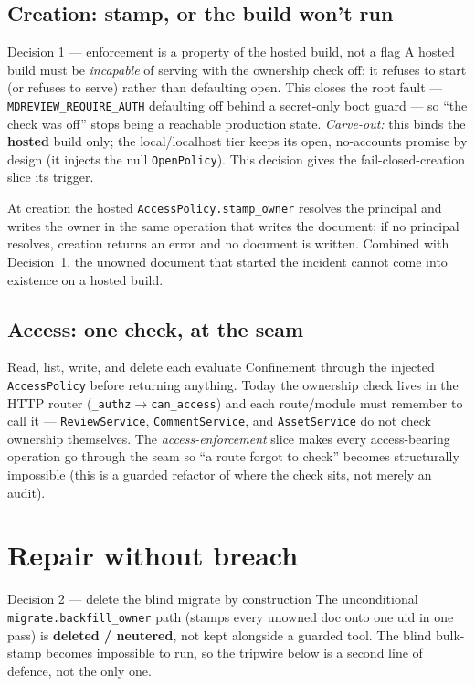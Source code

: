 \documentclass[11pt]{article}
\begin{document}
\subsection{Creation: stamp, or the build won't run}
\begin{decision}{Decision 1 --- enforcement is a property of the hosted build, not a flag}
A hosted build must be \emph{incapable} of serving with the ownership check off: it refuses to
start (or refuses to serve) rather than defaulting open. This closes the root fault ---
\texttt{MDREVIEW\_REQUIRE\_AUTH} defaulting off behind a secret-only boot guard --- so ``the
check was off'' stops being a reachable production state. \emph{Carve-out:} this binds the
\textbf{hosted} build only; the local/localhost tier keeps its open, no-accounts promise by
design (it injects the null \texttt{OpenPolicy}). This decision gives the fail-closed-creation
slice its trigger.
\end{decision}

At creation the hosted \texttt{AccessPolicy.stamp\_owner} resolves the principal and writes the
owner in the same operation that writes the document; if no principal resolves, creation returns
an error and no document is written. Combined with Decision~1, the unowned document that started
the incident cannot come into existence on a hosted build.

\subsection{Access: one check, at the seam}
Read, list, write, and delete each evaluate Confinement through the injected \texttt{AccessPolicy}
before returning anything. Today the ownership check lives in the HTTP router
(\texttt{\_authz}$\rightarrow$\texttt{can\_access}) and each route/module must remember to call
it --- \texttt{ReviewService}, \texttt{CommentService}, and \texttt{AssetService} do not check
ownership themselves. The \emph{access-enforcement} slice makes every access-bearing operation go
through the seam so ``a route forgot to check'' becomes structurally impossible (this is a
guarded refactor of where the check sits, not merely an audit).

\section{Repair without breach}
\label{sec:repair}

\begin{decision}{Decision 2 --- delete the blind migrate by construction}
The unconditional \texttt{migrate.backfill\_owner} path (stamps every unowned doc onto one uid in
one pass) is \textbf{deleted / neutered}, not kept alongside a guarded tool. The blind bulk-stamp
becomes impossible to run, so the tripwire below is a second line of defence, not the only one.
\end{decision}
\end{document}
